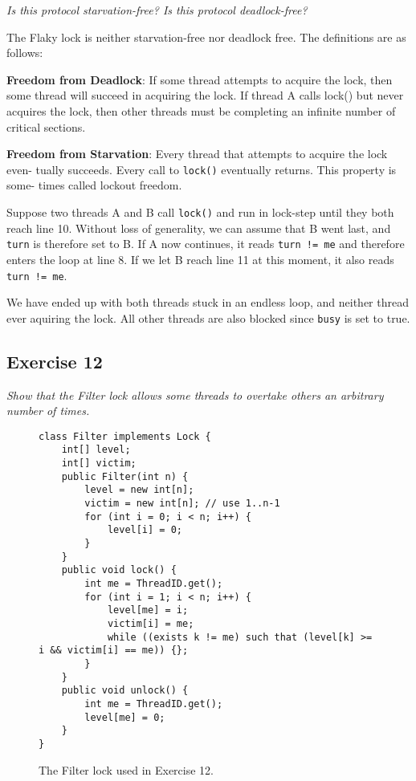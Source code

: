 \documentclass[a4paper,10pt]{article}
\begin{document}
\emph{Is this protocol starvation-free? Is this protocol deadlock-free?}

\vspace{3mm}

The Flaky lock is neither starvation-free nor deadlock free. The definitions are 
as follows:

\textbf{Freedom from Deadlock}: If some thread attempts to acquire the lock, then some
thread will succeed in acquiring the lock. If thread A calls lock() but never
acquires the lock, then other threads must be completing an infinite number
of critical sections.

\textbf{Freedom from Starvation}: Every thread that attempts to acquire the lock even-
tually succeeds. Every call to \lstinline|lock()| eventually returns. This property is some-
times called lockout freedom.

\vspace{3mm}

Suppose two threads A and B call \lstinline|lock()| and run in lock-step until they both reach
line 10. Without loss of generality, we can assume that B went last, and \lstinline|turn|
is therefore set to B. If A now continues, it reads \lstinline|turn != me| and therefore enters
the loop at line 8. If we let B reach line 11 at this moment, it also reads \lstinline|turn != me|.

We have ended up with both threads stuck in an endless loop, and neither thread 
ever aquiring the lock. All other threads are also blocked since \lstinline|busy|
is set to true.

\subsection{Exercise 12}

\emph{Show that the Filter lock allows some threads to overtake others an
arbitrary number of times.}

\vspace{3mm}

\begin{figure}
\begin{lstlisting}
class Filter implements Lock {
    int[] level;
    int[] victim;
    public Filter(int n) {
        level = new int[n];
        victim = new int[n]; // use 1..n-1
        for (int i = 0; i < n; i++) {
            level[i] = 0;
        }
    }
    public void lock() {
        int me = ThreadID.get();
        for (int i = 1; i < n; i++) {
            level[me] = i;
            victim[i] = me;
            while ((exists k != me) such that (level[k] >= i && victim[i] == me)) {};
        }
    }
    public void unlock() {
        int me = ThreadID.get();
        level[me] = 0;
    }
}
\end{lstlisting}
\caption{The Filter lock used in Exercise 12.}
\label{fig:filter}
\end{figure}
\end{document}
